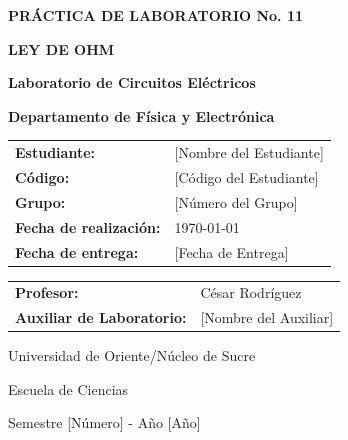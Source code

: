 \documentclass[12pt]{article}
\begin{document}
\begin{titlepage}
    \centering
    \vspace*{2cm}
    
    
    \vspace{1.5cm}
    
    {\Huge\bfseries PRÁCTICA DE LABORATORIO No. 11\par}
    {\Huge\bfseries LEY DE OHM\par}
    
    \vspace{1.5cm}
    
    {\Large\bfseries Laboratorio de Circuitos Eléctricos\par}
    {\Large\bfseries Departamento de Física y Electrónica\par}
    
    \vspace{2cm}
    
    \begin{tabular}{ll}
        \textbf{Estudiante:} & [Nombre del Estudiante] \\
        \textbf{Código:} & [Código del Estudiante] \\
        \textbf{Grupo:} & [Número del Grupo] \\
        \textbf{Fecha de realización:} & \today \\
        \textbf{Fecha de entrega:} & [Fecha de Entrega] \\
    \end{tabular}
    
    \vspace{2cm}
    
    \begin{tabular}{ll}
        \textbf{Profesor:} & César Rodríguez \\
        \textbf{Auxiliar de Laboratorio:} & [Nombre del Auxiliar] \\
    \end{tabular}
    
    \vspace{2cm}
    
    {\large Universidad de Oriente/Núcleo de Sucre \par}
    {\large Escuela de Ciencias \par}
    {\large Semestre [Número] - Año [Año] \par}
    
    \vfill
\end{titlepage}
\end{document}
